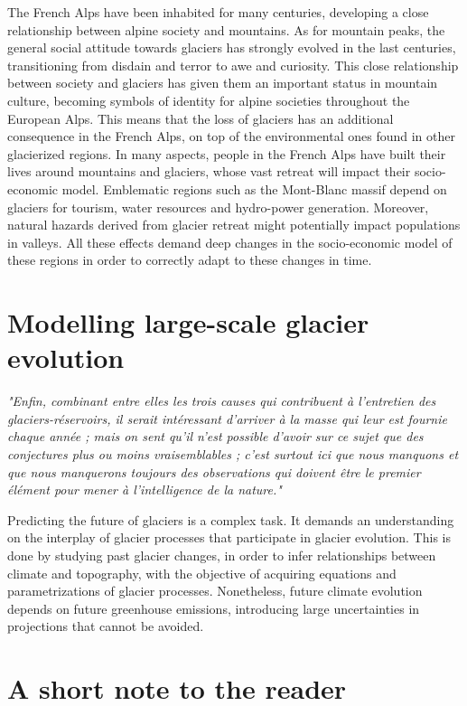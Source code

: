 The French Alps have been inhabited for many centuries, developing a close relationship between alpine society and mountains. As for mountain peaks, the general social attitude towards glaciers has strongly evolved in the last centuries, transitioning from disdain and terror to awe and curiosity. This close relationship between society and glaciers has given them an important status in mountain culture, becoming symbols of identity for alpine societies throughout the European Alps. This means that the loss of glaciers has an additional consequence in the French Alps, on top of the environmental ones found in other glacierized regions. In many aspects, people in the French Alps have built their lives around mountains and glaciers, whose vast retreat will impact their socio-economic model. Emblematic regions such as the Mont-Blanc massif depend on glaciers for tourism, water resources and hydro-power generation. Moreover, natural hazards derived from glacier retreat might potentially impact populations in valleys. All these effects demand deep changes in the socio-economic model of these regions in order to correctly adapt to these changes in time. 

\section{Modelling large-scale glacier evolution}

\emph{"Enfin, combinant entre elles les trois causes qui contribuent à l'entretien des glaciers-réservoirs, il serait intéressant d'arriver à la masse qui leur est fournie chaque année ; mais on sent qu'il n'est possible d'avoir sur ce sujet que des conjectures plus ou moins vraisemblables ; c'est surtout ici que nous manquons et que nous manquerons toujours des observations qui doivent être le premier élément pour mener à l'intelligence de la nature."}

Predicting the future of glaciers is a complex task. It demands an understanding on the interplay of glacier processes that participate in glacier evolution. This is done by studying past glacier changes, in order to infer relationships between climate and topography, with the objective of acquiring equations and parametrizations of glacier processes. Nonetheless, future climate evolution depends on future greenhouse emissions, introducing large uncertainties in projections that cannot be avoided.  

\section{A short note to the reader}
\Blindtext
